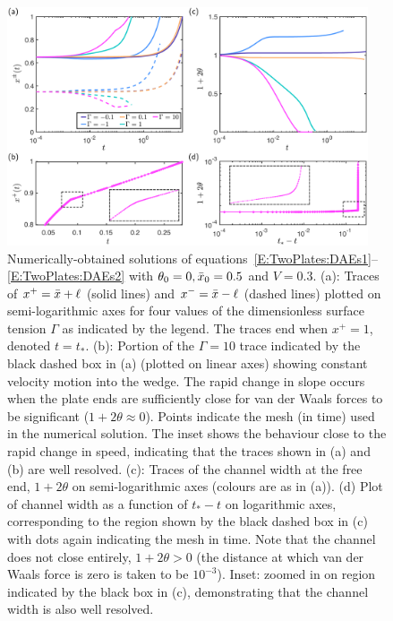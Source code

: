 \begin{figure}[h!]
\centering
\includegraphics[width = 0.95\textwidth]{Traces_menisci_and_tapering.pdf}
\caption{Numerically-obtained solutions of equations~\eqref{E:TwoPlates:DAEs1}--\eqref{E:TwoPlates:DAEs2} with $\theta_0 = 0, \bar{x}_0 = 0.5$ and $V = 0.3$. (a): Traces of $x^{+} = \bar{x}+\ell$ (solid lines) and $x^{-} = \bar{x}-\ell$ (dashed lines) plotted on semi-logarithmic axes for four values of the dimensionless surface tension $\Gamma$ as indicated by the legend. The traces end when $x^+ = 1$, denoted $t =t_*$. (b): Portion of the  $\Gamma = 10$ trace indicated by the black dashed box in (a) (plotted on linear axes) showing constant velocity motion into the wedge. The rapid change in slope occurs when the plate ends are sufficiently close for van der Waals forces to be significant ($1 + 2\theta \approx 0$). Points indicate the mesh (in time) used in the numerical solution. The inset shows the behaviour close to the rapid change in speed, indicating that the traces shown in (a) and (b) are well resolved. (c): Traces of the channel width at the free end, $1 + 2 \theta$ on semi-logarithmic axes (colours are as in (a)). (d) Plot of channel width as a function of $t_* -t$ on logarithmic axes, corresponding to the region shown by the black dashed box in (c) with dots again indicating the mesh in time. Note that the channel does not close entirely, $1 + 2\theta >0$ (the distance at which van der Waals force is zero is taken to be $10^{-3}$). Inset: zoomed in on region indicated by the black box in (c), demonstrating that the channel width is also well resolved.}
\label{fig:TwoPlates:NumSols}
\end{figure}

